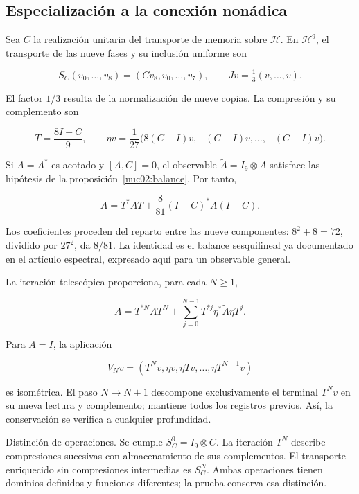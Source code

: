 \subsection{Especialización a la conexión nonádica}

Sea \(C\) la realización unitaria del transporte de memoria sobre \(\mathcal H\). En \(\mathcal H^9\), el transporte de las nueve fases y su inclusión uniforme son

\[
S_C(v_0,\ldots,v_8)=(Cv_8,v_0,\ldots,v_7),
\qquad Jv=\tfrac13(v,\ldots,v).
\]

El factor \(1/3\) resulta de la normalización de nueve copias. La compresión y su complemento son

\[
T=\frac{8I+C}{9},\qquad
\eta v=\frac1{27}\bigl(8(C-I)v,-(C-I)v,\ldots,-(C-I)v\bigr).
\]

Si \(A=A^*\) es acotado y \([A,C]=0\), el observable \(\widetilde A=I_9\otimes A\) satisface las hipótesis de la proposición~\ref{nuc02:balance}. Por tanto,

\begin{equation}
\boxed{A=T^*AT+\frac8{81}(I-C)^*A(I-C).}\label{nuc02:eq:2}
\end{equation}

Los coeficientes proceden del reparto entre las nueve componentes: \(8^2+8=72\), dividido por \(27^2\), da \(8/81\). La identidad es el balance sesquilineal ya documentado en el artículo espectral, expresado aquí para un observable general.

La iteración telescópica proporciona, para cada \(N\geq1\),

\begin{equation}
A=T^{*N}AT^N+
\sum_{j=0}^{N-1}T^{*j}\eta^*\widetilde A\eta T^j.\label{nuc02:eq:3}
\end{equation}

Para \(A=I\), la aplicación

\[
V_Nv=(T^Nv,\eta v,\eta Tv,\ldots,\eta T^{N-1}v)
\]

es isométrica. El paso \(N\to N+1\) descompone exclusivamente el terminal \(T^Nv\) en su nueva lectura y complemento; mantiene todos los registros previos. Así, la conservación se verifica a cualquier profundidad.

Distinción de operaciones. Se cumple \(S_C^9=I_9\otimes C\). La iteración \(T^N\) describe compresiones sucesivas con almacenamiento de sus complementos. El transporte enriquecido sin compresiones intermedias es \(S_C^N\). Ambas operaciones tienen dominios definidos y funciones diferentes; la prueba conserva esa distinción.

